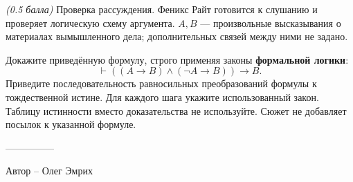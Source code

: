 \question
\textit{(0.5 балла)} Проверка рассуждения. Феникс Райт готовится к слушанию и проверяет логическую схему аргумента. $A,B$ --- произвольные высказывания о материалах вымышленного дела; дополнительных связей между ними не задано.

Докажите приведённую формулу, строго применяя законы \textbf{формальной логики}:
\[
\vdash ((A\to B)\land(\neg A\to B))\to B.
\]
Приведите последовательность равносильных преобразований формулы к тождественной истине. Для каждого шага укажите использованный закон. Таблицу истинности вместо доказательства не используйте. Сюжет не добавляет посылок к указанной формуле.

---------------

Автор -- Олег Эмрих
